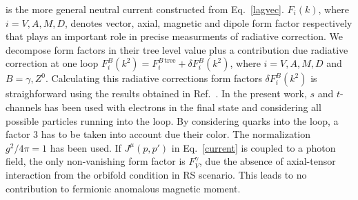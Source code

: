 \documentclass[twocolumn,showpacs,showkeys,prd,superscriptaddress]{revtex4-1}
\begin{document}
is the more general neutral current constructed from Eq.~\eqref{lagvec}. $F_i(k)$, where $i=V,A,M,D$, denotes vector, axial, magnetic and dipole form factor respectively that plays an important role in precise measurments of radiative correction. %
%  
We decompose form factors in their tree level value plus a contribution due radiative correction at one loop $F_i^B(k^2) = F_i^{B\,\text{tree}} + \delta F_i^B(k^2)$, where $i=V,A,M,D$ and $B = \gamma,Z^0$. Calculating this radiative corrections form factors $\delta F_i^B(k^2)$ is straighforward using the results obtained in Ref.~\cite{GonzalezGarcia:1998ay}. In the present work, $s$ and $t$-channels has been used with electrons in the final state and considering all possible particles running into the loop. By considering quarks into the loop, a factor $3$ has to be taken into account due their color. The normalization $g^2/4\pi = 1$ has been used. If $J^\mu(p,p')$ in Eq.~\eqref{current} is coupled to a photon field, the only non-vanishing form factor is $F_V^\gamma$, due the absence of axial-tensor interaction from the orbifold condition in RS scenario. This leads to no contribution to fermionic anomalous magnetic moment.
\end{document}
